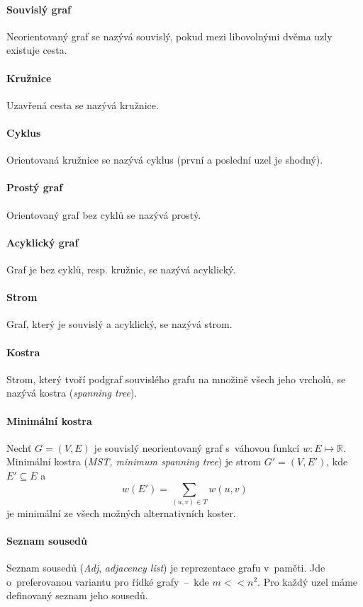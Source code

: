 \paragraph*{Souvislý graf} Neorientovaný graf se nazývá souvislý, pokud mezi libovolnými dvěma uzly existuje cesta.

\paragraph*{Kružnice} Uzavřená cesta se nazývá kružnice.

\paragraph*{Cyklus} Orientovaná kružnice se nazývá cyklus (první a poslední uzel je shodný).

\paragraph*{Prostý graf} Orientovaný graf bez cyklů se nazývá prostý.

\paragraph*{Acyklický graf} Graf je bez cyklů, resp. kružnic, se nazývá acyklický.

\paragraph*{Strom} Graf, který je souvislý a acyklický, se nazývá strom.

\paragraph*{Kostra} Strom, který tvoří podgraf souvislého grafu na množině všech jeho vrcholů, se nazývá kostra (\textit{spanning tree}).

\paragraph*{Minimální kostra} Nechť $G = (V, E)$ je souvislý neorientovaný graf s~váhovou funkcí $w : E \mapsto \mathbb{R}$. Minimální kostra (\textit{MST, minimum spanning tree}) je strom $G' = (V, E')$, kde $E' \subseteq E$ a $$w(E') = \sum_{(u,v) \in T} w(u, v)$$ je minimální ze všech možných alternativních koster.

\paragraph*{Seznam sousedů} Seznam sousedů (\textit{Adj}, \textit{adjacency list}) je reprezentace grafu v~paměti. Jde o~preferovanou variantu pro řídké grafy~--~kde $m << n^2$. Pro každý uzel máme definovaný seznam jeho sousedů.

